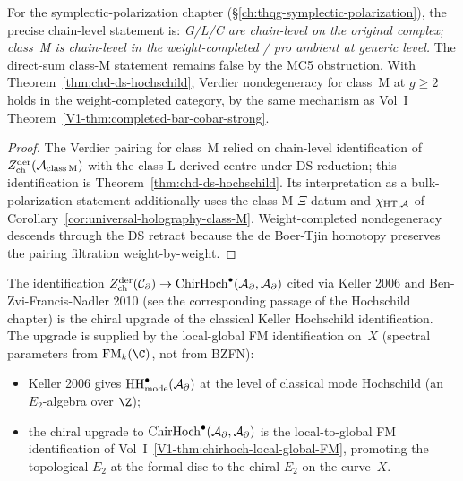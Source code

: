 \begin{proposition}
\label{prop:uhf-symplectic-polarization}
For the symplectic-polarization chapter
(\S\ref*{ch:thqg-symplectic-polarization}), the precise chain-level
statement is:
\emph{G/L/C are chain-level on the original complex; class~M is
chain-level in the weight-completed / pro ambient at generic level.}
The direct-sum class-M statement remains false by the MC5 obstruction.
With Theorem~\ref*{thm:chd-ds-hochschild}, Verdier nondegeneracy for
class~M at $g \geq 2$ holds in the weight-completed category, by the
same mechanism as Vol~I
Theorem~\ref*{V1-thm:completed-bar-cobar-strong}.
\end{proposition}

\begin{proof}
The Verdier pairing for class~M relied on chain-level
identification of
$Z^{\mathrm{der}}_{\mathrm{ch}}(\mathcal{A}_{\mathrm{class\,M}})$ with the class-L derived centre
under DS reduction; this identification is
Theorem~\ref*{thm:chd-ds-hochschild}. Its interpretation as a
bulk-polarization statement additionally uses the class-M
\(\Xi\)-datum and \(\chi_{\mathrm{HT},\mathcal{A}}\) of
Corollary~\ref*{cor:universal-holography-class-M}. Weight-completed
nondegeneracy descends through the DS retract because the de
Boer-Tjin homotopy preserves the pairing filtration weight-by-weight.
\end{proof}

\begin{proposition}
\label{prop:uhf-kel06-chirality}
The identification $Z^{\mathrm{der}}_{\mathrm{ch}}(\mathcal{C}_\partial) \to \mathrm{ChirHoch}^\bullet(\mathcal{A}_\partial, \mathcal{A}_\partial)$
cited via Keller 2006 and Ben-Zvi-Francis-Nadler 2010
(see the corresponding passage of the Hochschild chapter)
is the chiral upgrade of the
classical Keller Hochschild identification. The upgrade is
supplied by the local-global FM identification on~$X$
\textup{(}spectral parameters from $\FM_k(\C)$, not from
BZFN\textup{)}:
\begin{itemize}
\item Keller 2006 gives $\mathrm{HH}^\bullet_{\mathrm{mode}}(\mathcal{A}_\partial)$
 at the level of classical mode Hochschild \textup{(}an $E_2$-algebra
 over $\Z$\textup{)};
\item the chiral upgrade to $\mathrm{ChirHoch}^\bullet(\mathcal{A}_\partial, \mathcal{A}_\partial)$
 is the local-to-global FM identification of
 Vol~I~\ref*{V1-thm:chirhoch-local-global-FM}, promoting the
 topological $E_2$ at the formal disc to the chiral $E_2$ on
 the curve~$X$.
\end{itemize}
\end{proposition}

